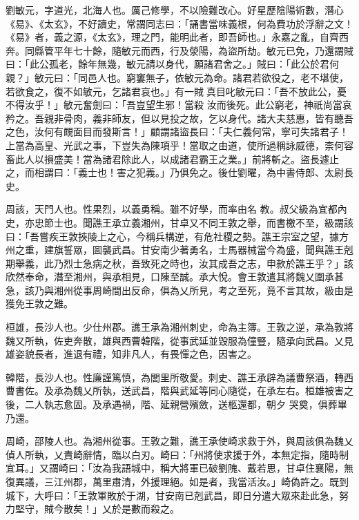 \begin{pinyinscope}
 劉敏元，字道光，北海人也。厲己修學，不以險難改心。好星歷陰陽術數，潛心《易》、《太玄》，不好讀史，常謂同志曰：「誦書當味義根，何為費功於浮辭之文！《易》者，義之源，《太玄》，理之門，能明此者，即吾師也。」永嘉之亂，自齊西奔。同縣管平年七十餘，隨敏元而西，行及滎陽，為盜所劫。敏元已免，乃還謂賊曰：「此公孤老，餘年無幾，敏元請以身代，願諸君舍之。」賊曰：「此公於君何親？」敏元曰：「同邑人也。窮窶無子，依敏元為命。諸君若欲役之，老不堪使，若欲食之，復不如敏元，乞諸君哀也。」有一賊真目叱敏元曰：「吾不放此公，憂不得汝乎！」敏元奮劍曰：「吾豈望生邪！當殺
 汝而後死。此公窮老，神祇尚當哀矜之。吾親非骨肉，義非師友，但以見投之故，乞以身代。諸大夫慈惠，皆有聽吾之色，汝何有靦面目而發斯言！」顧謂諸盜長曰：「夫仁義何常，寧可失諸君子！上當為高皇、光武之事，下豈失為陳項乎！當取之由道，使所過稱詠威德，柰何容畜此人以損盛美！當為諸君除此人，以成諸君霸王之業。」前將斬之。盜長遽止之，而相謂曰：「義士也！害之犯義。」乃俱免之。後仕劉曜，為中書侍郎、太尉長史。



 周該，天門人也。性果烈，以義勇稱。雖不好學，而率由名
 教。叔父級為宜都內史，亦忠節士也。聞譙王承立義湘州，甘卓又不同王敦之舉，而書檄不至，級謂該曰：「吾嘗疾王敦挾陵上之心，今稱兵構逆，有危社稷之勢。譙王宗室之望，據方州之重，建旗誓眾，圖襲武昌。甘安南少著勇名，士馬器械當今為盛，聞與譙王剋期舉義，此乃烈士急病之秋，吾致死之時也，汝其成吾之志，申款於譙王乎？」該欣然奉命，潛至湘州，與承相見，口陳至誠。承大悅。會王敦遣其將魏乂圍承甚急，該乃與湘州從事周崎間出反命，俱為乂所見，考之至死，竟不言其故，級由是獲免王敦之難。



 桓雄，長沙人也。少仕州郡。譙王承為湘州刺史，命為主簿。王敦之逆，承為敦將魏又所執，佐吏奔散，雄與西曹韓階，從事武延並毀服為僮豎，隨承向武昌。乂見雄姿貌長者，進退有禮，知非凡人，有畏憚之色，因害之。



 韓階，長沙人也。性廉謹篤慎，為閭里所敬愛。刺史、譙王承辟為議曹祭酒，轉西曹書佐。及承為魏乂所執，送武昌，階與武延等同心隨從，在承左右。桓雄被害之後，二人執志愈固。及承遇禍，階、延親營殯斂，送柩還都，朝夕
 哭奠，俱葬畢乃還。



 周崎，邵陵人也。為湘州從事。王敦之難，譙王承使崎求救于外，與周該俱為魏乂偵人所執，乂責崎辭情，臨以白刃。崎曰：「州將使求援于外，本無定指，隨時制宜耳。」又謂崎曰：「汝為我語城中，稱大將軍已破劉隗、戴若思，甘卓住襄陽，無復異議，三江州郡，萬里肅清，外援理絕。如是者，我當活汝。」崎偽許之。既到城下，大呼曰：「王敦軍敗於于湖，甘安南已剋武昌，即日分遣大眾來赴此急，努力堅守，賊今散矣！」乂於是數而殺之。




\end{pinyinscope}
